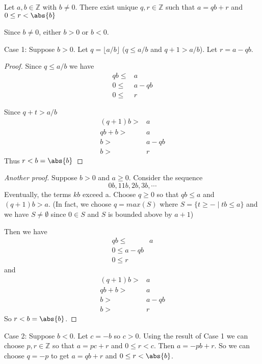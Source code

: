 
\begin{thm}
Let $a,b\in\mathbb{Z}$ with $b\neq 0$. There exist unique $q,r\in\mathbb{Z}$ such that $a = qb+r$ and $0\leq r< \abs{b}$
\end{thm}

Since $b\neq 0$, either $b>0$ or $b<0$.

Case 1: Suppose $b>0$. Let $q = \lfloor a/b \rfloor$ ($q\leq a/b$ and $q+1 > a/b$). Let $r=a-qb$. 

\begin{proof}
Since $q\leq a/b$ we have \begin{align*}
    qb\leq & a \\
    0 \leq & a-qb \\
    0 \leq & r
\end{align*}

Since $q+t > a/b$ \begin{align*}
    (q+1)b >& a \\
    qb+b > & a \\
    b > & a-qb \\
    b > & r
\end{align*}
Thus $r<b = \abs{b}$
\end{proof}

\begin{proof}[Another proof]
Suppose $b>0$ and $a\geq 0$. Consider the sequence \[0b,11b,2b,3b,\cdots\] Eventually, the terms $kb$ exceed a. Choose $q\geq 0$ so that $qb\leq a$ and $(q+1)b > a$. (In fact, we choose $q = max(S)$ where $S = \{t\geq - \mid tb \leq a\}$ and we have $S\neq \emptyset$ since $0\in S$ and $S$ is bounded above by $a+1$)

Then we have \begin{align*}
    qb \leq & a \\
    0 \leq a - qb \\ 
    0 \leq r
\end{align*}
and \begin{align*}
    (q+1) b >& a \\ 
    qb+b>&a\\
    b >& a-qb \\
    b > & r
\end{align*}
So $r<b = \abs{b}$.
\end{proof}

Case 2: Suppose $b< 0$. Let $c = -b$ so $c > 0$. Using the result of Case 1 we can choose $p,r\in\mathbb{Z}$ so that $a= pc + r $ and $0 \leq r < c$. Then $a = -pb + r$. So we can choose $q = -p$ to get $a = qb+r$ and $0\leq r <\abs{b}$.


